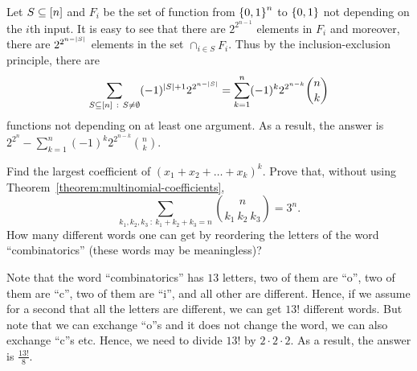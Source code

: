 \begin{chapterendexercises}
    \begin{solution}
      Let $S \subseteq {[{n}]}$ and $F_i$ be the set of function from $\set{0,
      1}^n$ to $\set{0, 1}$ not depending on the $i$th input. It is easy to see
      that there are $2^{2^{n - 1}}$ elements in $F_i$ and moreover, there are
      $2^{2^{n - \left|{S}\right|}}$ elements in the set $\cap_{i \in S} F_i$.
      Thus by the inclusion-exclusion principle, there are
      \[
        \sum_{S \subseteq [n] ~:~ S \neq \emptyset} 
          (-1)^{\left|{S}\right| + 1} 2^{2^{n - \left|{S}\right|}} =
        \sum_{k = 1}^n (-1)^k 2^{2^{n - k}} \binom{n}{k}
      \]
      functions not depending on at least one argument.
      As a result, the answer is $2^{2^n} -
      \sum_{k = 1}^n (-1)^k 2^{2^{n - k}} \binom{n}{k}$.
    \end{solution}
  \exercise Find the largest coefficient of $(x_1 + x_2 + \dots + x_k)^k$.
  \exercise Prove that,
    without using Theorem~\ref{theorem:multinomial-coefficients},
    \[
      \sum_{k_1, k_2, k_3 ~:~ k_1 + k_2 + k_3 = n} \binom{n}{k_1 \ k_2 \ k_3} =
      3^n.
    \]
  \exercise How many different words one can get by reordering the letters of
    the word ``combinatorics'' (these words may be meaningless)?
    \begin{solution}
      Note that the word ``combinatorics'' has $13$ letters, two of them are
      ``o'', two of them are ``c'', two of them are ``i'', and all other are
      different. Hence, if we assume for a second that all the letters are
      different, we can get $13!$ different words. But note that we can exchange
      ``o''s and it does not change the word, we can also exchange ``c''s etc.
      Hence, we need to divide $13!$ by $2 \cdot 2 \cdot 2$. As a result, the
      answer is $\frac{13!}{8}$.
    \end{solution}
\end{chapterendexercises}
